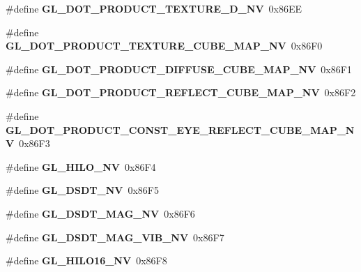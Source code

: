 \begin{DoxyCompactItemize}
\item 
\#define {\bfseries G\+L\+\_\+\+D\+O\+T\+\_\+\+P\+R\+O\+D\+U\+C\+T\+\_\+\+T\+E\+X\+T\+U\+R\+E\+\_\+D\+\_\+\+N\+V}~0x86\+E\+E\label{_s_d_l__opengl_8h_abb27a9eecefc045345a3a2cf0b93210c}

\item 
\#define {\bfseries G\+L\+\_\+\+D\+O\+T\+\_\+\+P\+R\+O\+D\+U\+C\+T\+\_\+\+T\+E\+X\+T\+U\+R\+E\+\_\+\+C\+U\+B\+E\+\_\+\+M\+A\+P\+\_\+\+N\+V}~0x86\+F0\label{_s_d_l__opengl_8h_a57db977a82f592520cffd31f06e86964}

\item 
\#define {\bfseries G\+L\+\_\+\+D\+O\+T\+\_\+\+P\+R\+O\+D\+U\+C\+T\+\_\+\+D\+I\+F\+F\+U\+S\+E\+\_\+\+C\+U\+B\+E\+\_\+\+M\+A\+P\+\_\+\+N\+V}~0x86\+F1\label{_s_d_l__opengl_8h_ae735f0271ead87b4bedba9e318192096}

\item 
\#define {\bfseries G\+L\+\_\+\+D\+O\+T\+\_\+\+P\+R\+O\+D\+U\+C\+T\+\_\+\+R\+E\+F\+L\+E\+C\+T\+\_\+\+C\+U\+B\+E\+\_\+\+M\+A\+P\+\_\+\+N\+V}~0x86\+F2\label{_s_d_l__opengl_8h_a32601e9ec6df5b209723f8359f8a16c9}

\item 
\#define {\bfseries G\+L\+\_\+\+D\+O\+T\+\_\+\+P\+R\+O\+D\+U\+C\+T\+\_\+\+C\+O\+N\+S\+T\+\_\+\+E\+Y\+E\+\_\+\+R\+E\+F\+L\+E\+C\+T\+\_\+\+C\+U\+B\+E\+\_\+\+M\+A\+P\+\_\+\+N\+V}~0x86\+F3\label{_s_d_l__opengl_8h_aa687825e7e9933664508e2d2199b1c16}

\item 
\#define {\bfseries G\+L\+\_\+\+H\+I\+L\+O\+\_\+\+N\+V}~0x86\+F4\label{_s_d_l__opengl_8h_ab710285d98f4aa7c4d2e4dcf8a270653}

\item 
\#define {\bfseries G\+L\+\_\+\+D\+S\+D\+T\+\_\+\+N\+V}~0x86\+F5\label{_s_d_l__opengl_8h_ad75abb33a3a52d6a3221174535d31dd7}

\item 
\#define {\bfseries G\+L\+\_\+\+D\+S\+D\+T\+\_\+\+M\+A\+G\+\_\+\+N\+V}~0x86\+F6\label{_s_d_l__opengl_8h_a72600080a260fc75df54c808aa4aa578}

\item 
\#define {\bfseries G\+L\+\_\+\+D\+S\+D\+T\+\_\+\+M\+A\+G\+\_\+\+V\+I\+B\+\_\+\+N\+V}~0x86\+F7\label{_s_d_l__opengl_8h_a42271728ce9b04670f3805b3f126ad2d}

\item 
\#define {\bfseries G\+L\+\_\+\+H\+I\+L\+O16\+\_\+\+N\+V}~0x86\+F8\label{_s_d_l__opengl_8h_a7554d7f9948c4cb2a2d0b5e73756cdba}


\end{DoxyCompactItemize}
